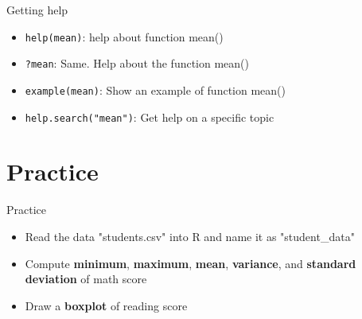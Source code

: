 \documentclass{beamer}					%
\begin{document}
\begin{frame}{Getting help}
\begin{itemize}

    \item \texttt{help(mean)}: help about function mean()
    \item \texttt{?mean}: Same. Help about the function mean()
    \item \texttt{example(mean)}: Show an example of function mean()
    \item \texttt{help.search("mean")}: Get help on a specific topic 
    
\end{itemize}
    
\end{frame}

\section{Practice}
\begin{frame}{Practice}
\begin{itemize}

\item Read the data "students.csv" into R and name it as "student\_data" 
\item Compute \textbf{minimum}, \textbf{maximum}, \textbf{mean}, \textbf{variance}, and \textbf{standard deviation} of math score
\item Draw a \textbf{boxplot} of reading score
\end{itemize}

    
\end{frame}
\end{document}
